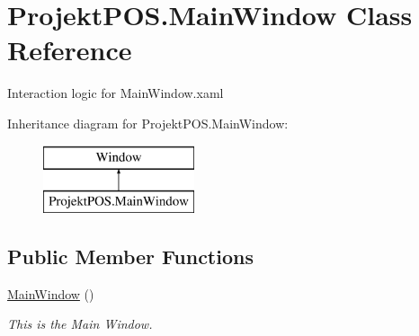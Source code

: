 \hypertarget{class_projekt_p_o_s_1_1_main_window}{}\section{Projekt\+P\+O\+S.\+Main\+Window Class Reference}
\label{class_projekt_p_o_s_1_1_main_window}


Interaction logic for Main\+Window.\+xaml  


Inheritance diagram for Projekt\+P\+O\+S.\+Main\+Window\+:\begin{figure}[H]
\begin{center}
\leavevmode
\includegraphics[height=2.000000cm]{class_projekt_p_o_s_1_1_main_window}
\end{center}
\end{figure}
\subsection*{Public Member Functions}
\begin{DoxyCompactItemize}
\item 
\hyperlink{class_projekt_p_o_s_1_1_main_window_accd74500e15ba53e22f8c803e78e3e65}{Main\+Window} ()
\begin{DoxyCompactList}\small\item\em This is the Main Window. \end{DoxyCompactList}\end{DoxyCompactItemize}
